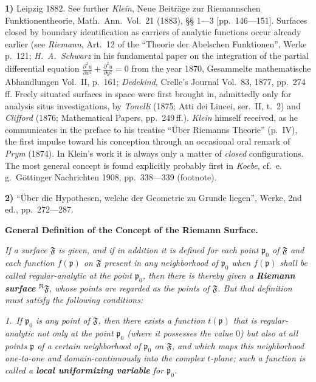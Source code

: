 \documentclass{article}
\begin{document}
\textbf{1)} Leipzig 1882. See further \emph{Klein}, Neue Beiträge zur Riemannschen Funktionentheorie, Math.\ Ann.\ Vol.\ 21 (1883), §§ 1---3 [pp.\ 146---151]. Surfaces closed by boundary identification as carriers of analytic functions occur already earlier (see \emph{Riemann}, Art.\ 12 of the ``Theorie der Abelschen Funktionen'', Werke p.\ 121; \emph{H.~A.~Schwarz} in his fundamental paper on the integration of the partial differential equation $\frac{\partial^2 u}{\partial x^2} + \frac{\partial^2 u}{\partial y^2} = 0$ from the year 1870, Gesammelte mathematische Abhandlungen Vol.\ II, p.\ 161; \emph{Dedekind}, Crelle's Journal Vol.\ 83, 1877, pp.\ 274\,ff. Freely situated surfaces in space were first brought in, admittedly only for analysis situs investigations, by \emph{Tonelli} (1875; Atti dei Lincei, ser.\ II, t.\ 2) and \emph{Clifford} (1876; Mathematical Papers, pp.\ 249\,ff.). \emph{Klein} himself received, as he communicates in the preface to his treatise ``Über Riemanns Theorie'' (p.\ IV), the first impulse toward his conception through an occasional oral remark of \emph{Prym} (1874). In Klein's work it is always only a matter of \emph{closed} configurations. The most general concept is found explicitly probably first in \emph{Koebe}, cf.\ e.\,g.\ Göttinger Nachrichten 1908, pp.\ 338---339 (footnote).

\textbf{2)} ``Über die Hypothesen, welche der Geometrie zu Grunde liegen'', Werke, 2nd ed., pp.\ 272---287.

\textbf{General Definition of the Concept of the Riemann Surface.}

\emph{If a surface $\mathfrak{F}$ is given, and if in addition it is defined for each point $\mathfrak{p}_0$ of $\mathfrak{F}$ and each function $f(\mathfrak{p})$ on $\mathfrak{F}$ present in any neighborhood of $\mathfrak{p}_0$ when $f(\mathfrak{p})$ shall be called regular-analytic at the point $\mathfrak{p}_0$, then there is thereby given a \textbf{Riemann surface} ${}^{\mathfrak{R}}\mathfrak{F}$, whose points are regarded as the points of $\mathfrak{F}$. But that definition must satisfy the following conditions:}

\emph{1.~If $\mathfrak{p}_0$ is any point of $\mathfrak{F}$, then there exists a function $t(\mathfrak{p})$ that is regular-analytic not only at the point $\mathfrak{p}_0$ (where it possesses the value $0$) but also at all points $\mathfrak{p}$ of a certain neighborhood of $\mathfrak{p}_0$ on $\mathfrak{F}$, and which maps this neighborhood one-to-one and domain-continuously into the complex $t$-plane; such a function is called a \textbf{local uniformizing variable} for $\mathfrak{p}_0$.}
\end{document}
